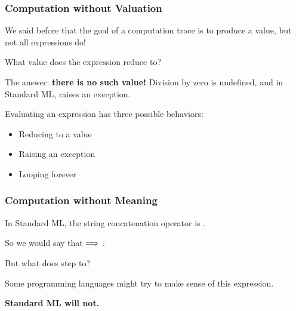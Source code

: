 \documentclass[aspectratio=169, handout]{beamer}
\begin{document}
\begin{frame}[fragile]
  \frametitle{Computation without Valuation}

  We said before that the goal of a computation trace is to produce a value, but not
  all expressions do!

  \pause
  \vspace{\fill}

  What value does the expression  reduce to?

  \pause
  \vspace{\fill}

  The answer: \textbf{there is no such value!} Division by zero is undefined, and in
  Standard ML, raises an exception.

  \pause
  \vspace{\fill}

  Evaluating an expression has three possible behaviors:
  \begin{itemize}
    \item Reducing to a value
    \item Raising an exception
    \item Looping forever
  \end{itemize}
\end{frame}

\begin{frame}[fragile]
  \frametitle{Computation without Meaning}

  In Standard ML, the string concatenation operator is \code{^}.

  \vspace{5pt}

  So we would say that  $\Longrightarrow$ .

  \pause
  \vspace{5pt}

  But what does  step to?

  \pause
  \vspace{\fill}

  Some programming languages might try to make sense of this expression.

  \vspace{5pt}

  \textbf{Standard ML will not.}
\end{frame}
\end{document}
